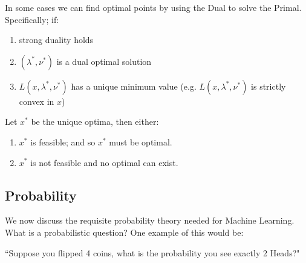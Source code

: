 \documentclass[]{article}
\theoremstyle{mattstyle}
\newtheorem{theorem}{Theorem}[section]
\theoremstyle{definition}
\begin{document}



In some cases we can find optimal points by using the Dual to solve the Primal. Specifically; if:
\begin{enumerate}
	\item strong duality holds
	\item $(\lambda^*, \nu^*)$ is a dual optimal solution
	\item $L(x, \lambda^*, \nu^*)$ has a unique minimum value (e.g. $L(x, \lambda^*, \nu^*)$ is strictly convex in $x$)
\end{enumerate}
Let $x^*$ be the unique optima, then either:
\begin{enumerate}
	\item $x^*$ is feasible; and so $x^*$ must be optimal.
	\item $x^*$ is not feasible and no optimal can exist.
\end{enumerate}

\newpage

\subsection{Probability}

We now discuss the requisite probability theory needed for Machine Learning. What is a probabilistic question? One example of this would be:
\begin{center}
``Suppose you flipped 4 coins, what is the probability you see exactly 2 Heads?"
\end{center}
\end{document}
